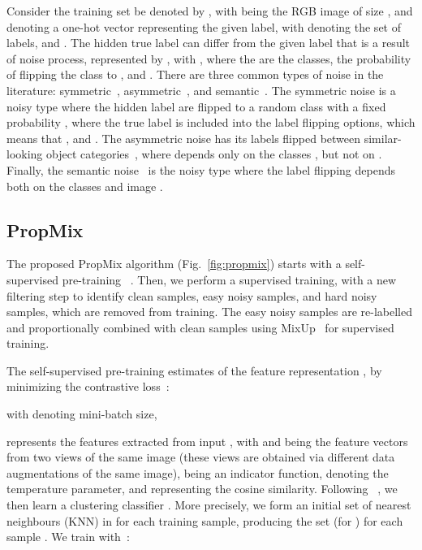 \documentclass{bmvc2k}
\begin{document}
Consider the training set be denoted by , with   being the  RGB image of size , and  denoting a one-hot vector representing the given label, with  denoting the set of labels, and . The hidden true label  can differ from the given label   that is a result of noise process, represented by , with ,
where the  are the classes,  the probability of flipping the class  to , and . There are three common types of noise in the literature:  symmetric~\citep{kim2019nlnl}, asymmetric~\citep{patrini2017making}, and semantic~\citep{rog}.
The symmetric noise is a noisy type where the hidden label are flipped to a 
random class
with a fixed probability , where the true label is included into the label flipping options, which means that , and . 
The asymmetric noise has its labels flipped between similar-looking object categories~\citep{patrini2017making}, where  depends only on the classes , but not on . Finally, the semantic noise~\citep{rog} is the noisy type where the label flipping depends both on the classes  and image . 

\vspace{-.1in}
\subsection{PropMix}
\label{sec:propmix}


The proposed PropMix algorithm (Fig.~\ref{fig:propmix}) starts with a self-supervised pre-training ~\citep{SimCLR,MoCo,MoCoV2,SCAN}.  Then, we perform a supervised training, with a new filtering step to identify clean samples, easy noisy samples, and hard noisy samples, which are removed from training. The easy noisy samples are re-labelled and proportionally combined with clean samples using MixUp~\citep{mixup} for supervised training. 

The self-supervised pre-training estimates  of the feature representation , by minimizing the contrastive loss~\citep{SimCLR,MoCo,MoCoV2}:

with  denoting mini-batch size, 

represents the features extracted from input , with  and   being the feature vectors from two views of the same image (these views are obtained via different data augmentations of the same image),
 being an indicator function,  denoting the temperature parameter, and  representing the cosine similarity.
Following ~\citep{SCAN}, we then learn a clustering classifier . More precisely, we form an initial set of  nearest neighbours (KNN) in  for each training sample, producing the set  (for ) for each sample  . We train  with~\citep{SCAN}:
\end{document}
